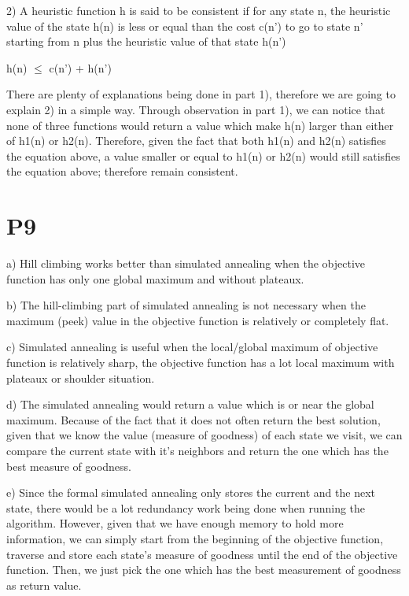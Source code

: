 \documentclass{article}
\begin{document}
\vspace{5mm}

2) A heuristic function h is said to be consistent if for any state n, the heuristic value of the state h{\small(n)} is less or equal than the cost c{\small(n')} to go to state n' starting from n plus the heuristic value of that state h{\small(n')}

\begin{center}

h{\small(n)} $\le$ c{\small(n')} + h{\small(n')}

\end{center}

There are plenty of explanations being done in part 1), therefore we are going to explain 2) in a simple way. Through observation in part 1), we can notice that none of three functions would return a value which make h{\small(n)} larger than either of h{\small1(n)} or h{\small2(n)}. Therefore, given the fact that both h{\small 1(n)} and h{\small 2(n)} satisfies the equation above, a value smaller or equal to h{\small 1(n)} or h{\small 2(n)} would still satisfies the equation above; therefore remain consistent.

\section*{P9}

\hspace{5mm} 

a) Hill climbing works better than simulated annealing when the objective function has only one global maximum and without plateaux.

b) The hill-climbing part of simulated annealing is not necessary when the maximum (peek) value in the objective function is relatively or completely flat.

c) Simulated annealing is useful when the local/global maximum of objective function is relatively sharp, the objective function has a lot local maximum with plateaux or shoulder situation.

d) The simulated annealing would return a value which is or near the global maximum. Because of the fact that it does not often return the best solution, given that we know the value (measure of goodness) of each state we visit, we can compare the current state with it's neighbors and return the one which has the best measure of goodness.

e) Since the formal simulated annealing only stores the current and the next state, there would be a lot redundancy work being done when running the algorithm. However, given that we have enough memory to hold more information, we can simply start from the beginning of the objective function, traverse and store each state's measure of goodness until the end of the objective function. Then, we just pick the one which has the best measurement of goodness as return value.
\end{document}

